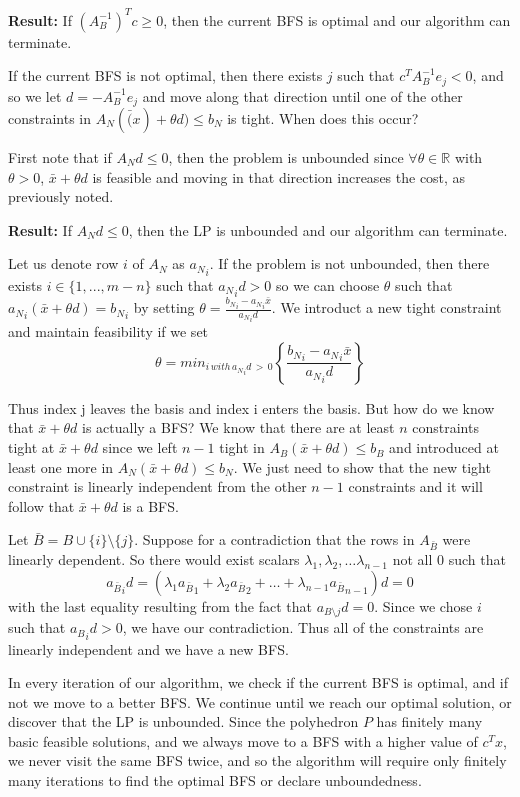 \documentclass[12pt]{article}
\begin{document}
\textbf{Result:} If $(A_B^{-1})^Tc \geq 0$, then the current BFS is optimal and our algorithm can terminate.
\medskip

If the current BFS is not optimal, then there exists $j$ such that $c^TA_B^{-1}e_j < 0$, and so we let $d = -A_B^{-1}e_j$ and move along that direction until one of the other constraints in $A_N(\bar(x) + \theta d) \leq b_N$ is tight. When does this occur?
\medskip

First note that if $A_Nd \leq 0$, then the problem is unbounded since $\forall \theta \in \mathbb{R}$ with $\theta > 0$, $\bar{x} + \theta d$ is feasible and moving in that direction increases the cost, as previously noted.
\medskip

\textbf{Result:} If $A_Nd \leq 0$, then the LP is unbounded and our algorithm can terminate.
\medskip

Let us denote row $i$ of $A_N$ as ${a_N}_i$. If the problem is not unbounded, then there exists $i \in \{1,...,m-n\}$ such that ${a_N}_i d > 0$ so we can choose $\theta$ such that ${a_N}_i(\bar{x} + \theta d) = {b_N}_i$ by setting $\theta = \frac{{b_N}_i - {a_N}_i\bar{x}}{{a_N}_id}$. We introduct a new tight constraint and maintain feasibility if we set
$$\theta = min_{i\, with\, {a_N}_id\,>\,0} \left\{ \frac{{b_N}_i - {a_N}_i\bar{x}}{{a_N}_id} \right\}$$
\medskip

Thus index j leaves the basis and index i enters the basis. But how do we know that $\bar{x} + \theta d$ is actually a BFS? We know that there are at least $n$ constraints tight at $\bar{x} + \theta d$ since we left $n - 1$ tight in $A_B(\bar{x} + \theta d) \leq b_B$ and introduced at least one more in $A_N(\bar{x} + \theta d) \leq b_N$. We just need to show that the new tight constraint is linearly independent from the other $n-1$ constraints and it will follow that $\bar{x} + \theta d$ is a BFS.
\medskip

Let $\bar{B} = B \cup \{i\} \setminus \{j\}$. Suppose for a contradiction that the rows in $A_{\bar{B}}$ were linearly dependent. So there would exist scalars $\lambda_1, \lambda_2, \dots \lambda_{n-1}$ not all 0 such that $${a_{\bar{B}}}_i d = (\lambda_1 {a_{\bar{B}}}_1 + \lambda_2 {a_{\bar{B}}}_2 + \dots + \lambda_{n-1} {a_{\bar{B}}}_{n-1}) d = 0$$ 
with the last equality resulting from the fact that $a_{B \setminus j} d = 0$. Since we chose $i$ such that ${a_B}_i d > 0$, we have our contradiction. Thus all of the constraints are linearly independent and we have a new BFS.
\medskip

In every iteration of our algorithm, we check if the current BFS is optimal, and if not we move to a better BFS. We continue until we reach our optimal solution, or discover that the LP is unbounded. Since the polyhedron $P$ has finitely many basic feasible solutions, and we always move to a BFS with a higher value of $c^Tx$, we never visit the same BFS twice, and so the algorithm will require only finitely many iterations to find the optimal BFS or declare unboundedness. 
\end{document}
